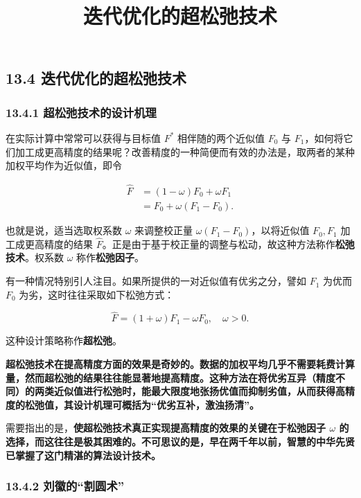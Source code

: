 \documentclass[
  10pt,
  fontset=fandol]{ctexart}
\title{迭代优化的超松弛技术}
\author{}
\date{}
\begin{document}
\maketitle

\subsection{13.4 迭代优化的超松弛技术}\label{ux8fedux4ee3ux4f18ux5316ux7684ux8d85ux677eux5f1bux6280ux672f}

\subsubsection{13.4.1 超松弛技术的设计机理}\label{ux8d85ux677eux5f1bux6280ux672fux7684ux8bbeux8ba1ux673aux7406}

在实际计算中常常可以获得与目标值 \(F^*\) 相伴随的两个近似值 \(F_0\) 与 \(F_1\)，如何将它们加工成更高精度的结果呢？改善精度的一种简便而有效的办法是，取两者的某种加权平均作为近似值，即令

\[
\begin{aligned}
\widehat F&=(1-\omega)F_0+\omega F_1\\
&=F_0+\omega(F_1-F_0).
\end{aligned}
\]

也就是说，适当选取权系数 \(\omega\) 来调整校正量 \(\omega(F_1-F_0)\)，以将近似值 \(F_0,F_1\) 加工成更高精度的结果 \(\widehat F\)。正是由于基于校正量的调整与松动，故这种方法称作\textbf{松弛技术}。权系数 \(\omega\) 称作\textbf{松弛因子}。

有一种情况特别引人注目。如果所提供的一对近似值有优劣之分，譬如 \(F_1\) 为优而 \(F_0\) 为劣，这时往往采取如下松弛方式：

\[
\widehat F=(1+\omega)F_1-\omega F_0,\quad\omega>0.
\]

这种设计策略称作\textbf{超松弛}。

\textbf{超松弛技术在提高精度方面的效果是奇妙的。数据的加权平均几乎不需要耗费计算量，然而超松弛的结果往往能显著地提高精度。这种方法在将优劣互异（精度不同）的两类近似值进行松弛时，能最大限度地张扬优值而抑制劣值，从而获得高精度的松弛值，其设计机理可概括为``优劣互补，激浊扬清''。}

需要指出的是，\textbf{使超松弛技术真正实现提高精度的效果的关键在于松弛因子 \(\omega\) 的选择，而这往往是极其困难的。不可思议的是，早在两千年以前，智慧的中华先贤已掌握了这门精湛的算法设计技术。}

\subsubsection{13.4.2 刘徽的``割圆术''}\label{ux5218ux5fbdux7684ux5272ux5706ux672f}
\end{document}
